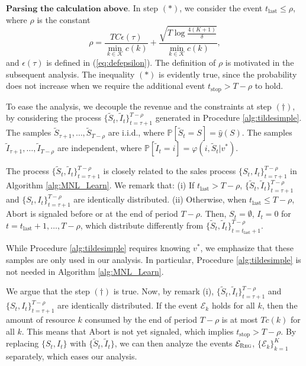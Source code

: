 \documentclass{article}
\theoremstyle{definition}
\newcommand{\PPP}{\mathbb{P}}
\newcommand{\KKK}{\mathcal{K}}
\begin{document}
$\textbf{Parsing the calculation above.}$ 
In step $(*)$, we consider the event $t_\text{last}\leq \rho$, where $\rho$ is the constant
\begin{equation}\label{eq:rho}
\rho = \frac{TC\epsilon(\tau)}{\min_{k\in\KKK}c(k)} + \frac{\sqrt{T\log\frac{4(K+1)}{\delta}}}{\min_{k\in\KKK}c(k)}, 
\end{equation}
and $\epsilon(\tau)$ is defined in (\ref{eq:defepsilon}). The definition of $\rho$ is motivated in the subsequent analysis. The inequality $(*)$ is evidently true, since the probability does not increase when we require the additional event $t_\text{stop} > T-\rho$ to hold. %

To ease the analysis, we decouple the revenue and the constraints at step $(\dagger)$, by considering the process  $\{\tilde{S}_t, \tilde{I}_t\}^{T-\rho}_{t=\tau + 1}$ generated in Procedure \ref{alg:tildesimple}. The samples $\tilde{S}_{\tau + 1}, \ldots, \tilde{S}_{T-\rho}$ are i.i.d., where $\PPP[\tilde{S}_t = S] = \hat{y}(S)$. The samples $\tilde{I}_{\tau + 1}, \ldots, \tilde{I}_{T-\rho}$ are independent, where $\PPP[\tilde{I}_t = i] = \varphi(i, \tilde{S}_t | v^*)$. 

The process $\{\tilde{S}_t, \tilde{I}_t\}^{T-\rho}_{t=\tau + 1}$ is closely related to the sales process $\{S_t, I_t\}^{T-\rho}_{t=\tau + 1}$ in Algorithm \ref{alg:MNL_Learn}. We remark that: (i) If $t_\text{last} > T - \rho$, $\{\tilde{S}_t, \tilde{I}_t\}^{T-\rho}_{t=\tau + 1}$ and $\{S_t, I_t\}^{T - \rho}_{t=\tau + 1}$ are identically distributed. (ii) Otherwise, when $t_\text{last}\leq T - \rho$, {\sc Abort} is signaled before or at the end of period $T - \rho$. Then, $S_t = \emptyset$, $I_t = 0$ for $t = t_\text{last} +1, \ldots, T - \rho$, which distribute differently from $\{\tilde{S}_t, \tilde{I}_t\}^{T-\rho}_{t=t_\text{last} + 1}$.

While Procedure \ref{alg:tildesimple} requires knowing $v^*$, we emphasize that these samples are only used in our analysis. In particular, Procedure \ref{alg:tildesimple} is not needed in Algorithm \ref{alg:MNL_Learn}. 

We argue that the step $(\dagger)$ is true. Now, by remark (i), $\{\tilde{S}_t, \tilde{I}_t\}^{T-\rho}_{t=\tau + 1}$ and $\{S_t, I_t\}^{T - \rho}_{t=\tau + 1}$ are identically distributed. If the event $\mathcal{E}_k$ holds for all $k$, then the amount of resource $k$ consumed by the end of period $T-\rho$ is at most $Tc(k)$ for all $k$. This means that {\sc Abort} is not yet signaled, which implies $t_\text{stop} > T-\rho$. By replacing $\{S_t, I_t\}$ with $\{\tilde{S}_t, \tilde{I}_t\}$, we can then analyze the events $\mathcal{E}_{\text{{\sc Reg}}}$, $\{\mathcal{E}_k\}^K_{k=1}$ separately, which eases our analysis.
\end{document}
